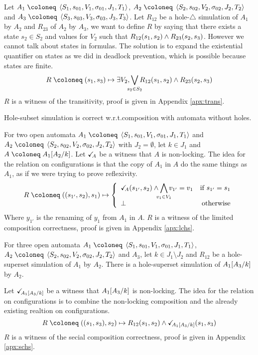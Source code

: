 \documentclass{article}
\begin{document}
Let \(A_1 \defobject \OAg[1]\), \(A_2 \defobject \OAg[2]\) and \(A_3 \defobject \OAg[3]\).
Let \(R_{12}\) be a hole-\(\triangle\) simulation of \(A_1\) by \(A_2\) and \(R_{23}\) of \(A_2\) by \(A_3\), we want to define \(R\) by saying that there exists a state \(s_2 \in S_2\) and values for \(V_2\) such that \(R_{12}{\left(s_1, s_2\right)} \wedge R_{23}{\left(s_2, s_3\right)}\).
However we cannot talk about states in formulas.
The solution is to expand the existential quantifier on states as we did in deadlock prevention, which is possible because states are finite.
\[ R \defobject \mpar{s_1, s_3} \mapsto \exists V_2, \bigvee_\subbox{s_2 \in S_2} R_{12}\mpar{s_1, s_2} \wedge R_{23}\mpar{s_2, s_3} \]
\(R\) is a witness of the transitivity, proof is given in Appendix \ref{apx:trans}.
\begin{prop}\label{prop:cc'} Hole-subset simulation is correct w.r.t.\@ composition with automata without holes. \end{prop}
For two open automata \(A_1 \defobject \OAg[1]\) and \(A_2 \defobject \OAg[2]\) with \(J_2 = \emptyset\), let \(k \in J_1\) and \(A \defobject A_1\subst{A_2}{k}\).
Let \(\checkmark_{\!\! A}\) be a witness that \(A\) is non-locking.
The idea for the relation on configurations is that the copy of \(A_1\) in \(A\) do the same things as \(A_1\), as if we were trying to prove reflexivity.
\[ R \defobject \mpar{\mpar{s_{1'}, s_2}, s_1} \mapsto \choice{\reach{A}\mpar{s_{1'}, s_2} \wedge \bigwedge_\subbox{v_1 \in V_1} v_{1'} = v_1 & \text{if } s_{1'} = s_1 \\ \bot & \text{otherwise}} \]
Where \(y_{1'}\) is the renaming of \(y_1\) from \(A_1\) in \(A\).
\(R\) is a witness of the limited composition correctness, proof is given in Appendix \ref{apx:lchs}.
\begin{prop}
For three open automata \(A_1 \defobject \OAg[1]\), \(A_2 \defobject \OAg[2]\) and \(A_3\), let \(k \in J_1 \setminus J_2\) and \(R_{12}\) be a hole-superset simulation of \(A_1\) by \(A_2\).
There is a hole-superset simulation of \(A_1{\left[A_3\middle/k\right]}\) by \(A_2\).
\end{prop}
Let \(\checkmark_{\!\! A_1{\left[A_3\middle/k\right]}}\) be a witness that \(A_1{\left[A_3\middle/k\right]}\) is non-locking.
The idea for the relation on configurations is to combine the non-locking composition and the already existing realtion on configurations.
\[ R \defobject \mpar{\mpar{s_1, s_3}, s_2} \mapsto R_{12}\mpar{s_1, s_2} \wedge \reach{A_1\subst{A_3}{k}}\mpar{s_1, s_3} \]
\(R\) is a witness of the secial composition correctness, proof is given in Appendix \ref{apx:schs}.
\end{document}
